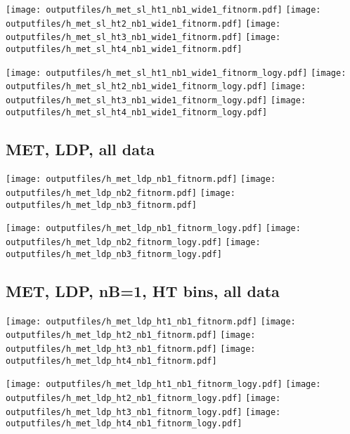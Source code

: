 \documentclass[11pt]{article}
\begin{document}
    \noindent
     \texttt{[image: outputfiles/h\_met\_sl\_ht1\_nb1\_wide1\_fitnorm.pdf]}
     \texttt{[image: outputfiles/h\_met\_sl\_ht2\_nb1\_wide1\_fitnorm.pdf]}
     \texttt{[image: outputfiles/h\_met\_sl\_ht3\_nb1\_wide1\_fitnorm.pdf]}
     \texttt{[image: outputfiles/h\_met\_sl\_ht4\_nb1\_wide1\_fitnorm.pdf]}

    \noindent
     \texttt{[image: outputfiles/h\_met\_sl\_ht1\_nb1\_wide1\_fitnorm\_logy.pdf]}
     \texttt{[image: outputfiles/h\_met\_sl\_ht2\_nb1\_wide1\_fitnorm\_logy.pdf]}
     \texttt{[image: outputfiles/h\_met\_sl\_ht3\_nb1\_wide1\_fitnorm\_logy.pdf]}
     \texttt{[image: outputfiles/h\_met\_sl\_ht4\_nb1\_wide1\_fitnorm\_logy.pdf]}


     \clearpage


    \subsection{ MET, LDP, all data}

    \noindent
     \texttt{[image: outputfiles/h\_met\_ldp\_nb1\_fitnorm.pdf]}
     \texttt{[image: outputfiles/h\_met\_ldp\_nb2\_fitnorm.pdf]}
     \texttt{[image: outputfiles/h\_met\_ldp\_nb3\_fitnorm.pdf]}

    \noindent
     \texttt{[image: outputfiles/h\_met\_ldp\_nb1\_fitnorm\_logy.pdf]}
     \texttt{[image: outputfiles/h\_met\_ldp\_nb2\_fitnorm\_logy.pdf]}
     \texttt{[image: outputfiles/h\_met\_ldp\_nb3\_fitnorm\_logy.pdf]}


     \subsection{ MET, LDP, nB=1, HT bins, all data}

    \noindent
     \texttt{[image: outputfiles/h\_met\_ldp\_ht1\_nb1\_fitnorm.pdf]}
     \texttt{[image: outputfiles/h\_met\_ldp\_ht2\_nb1\_fitnorm.pdf]}
     \texttt{[image: outputfiles/h\_met\_ldp\_ht3\_nb1\_fitnorm.pdf]}
     \texttt{[image: outputfiles/h\_met\_ldp\_ht4\_nb1\_fitnorm.pdf]}

    \noindent
     \texttt{[image: outputfiles/h\_met\_ldp\_ht1\_nb1\_fitnorm\_logy.pdf]}
     \texttt{[image: outputfiles/h\_met\_ldp\_ht2\_nb1\_fitnorm\_logy.pdf]}
     \texttt{[image: outputfiles/h\_met\_ldp\_ht3\_nb1\_fitnorm\_logy.pdf]}
     \texttt{[image: outputfiles/h\_met\_ldp\_ht4\_nb1\_fitnorm\_logy.pdf]}
\end{document}
